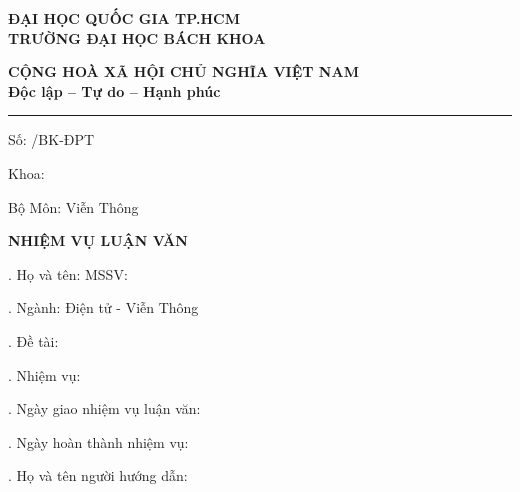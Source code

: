 \thispagestyle{empty}


\begin{center}
\parbox{0.45\textwidth}{
    \centering
    \textbf{\small ĐẠI HỌC QUỐC GIA TP.HCM} \\
    \textbf{\small TRƯỜNG ĐẠI HỌC BÁCH KHOA}
}
\hfill
\parbox{0.45\textwidth}{
    \centering
    \textbf{\small CỘNG HOÀ XÃ HỘI CHỦ NGHĨA VIỆT NAM} \\
    \textbf{\small Độc lập -- Tự do -- Hạnh phúc}
}
\end{center}

\vspace{0.4cm}
\noindent\rule{\textwidth}{0.4pt}
\vspace{0.4cm}

\noindent
Số: \underline{\hspace{3cm}} /BK-ĐPT

\noindent
Khoa: \DEPARTMENT

\noindent
Bộ Môn: Viễn Thông

\vspace{0.6cm}

\begin{center}
    \textbf{\large NHIỆM VỤ LUẬN VĂN}
\end{center}

\vspace{0.6cm}

. Họ và tên: \TENTACGIA \hspace{2cm} MSSV: \MSSV

\vspace{0.3cm}
. Ngành: Điện tử - Viễn Thông

\vspace{0.3cm}
. Đề tài: \TENLUANVAN

\vspace{0.3cm}
. Nhiệm vụ:

\vspace{0.6cm}

. Ngày giao nhiệm vụ luận văn: \dotfill

\vspace{0.3cm}
. Ngày hoàn thành nhiệm vụ: \dotfill

\vspace{0.3cm}
. Họ và tên người hướng dẫn: \TENCANBO

\vspace{0.6cm}

